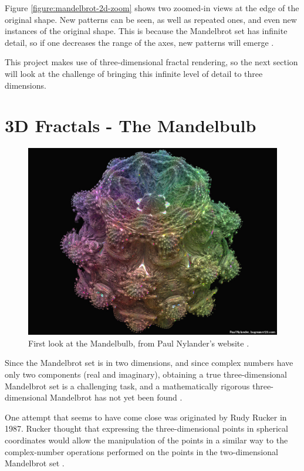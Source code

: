 Figure \ref{figure:mandelbrot-2d-zoom} shows two zoomed-in views at the edge of the original shape. New patterns can be seen, as well as repeated ones, and even new instances of the original shape. This is because the Mandelbrot set has infinite detail, so if one decreases the range of the axes, new patterns will emerge \cite{ashlock2006evolutionary}.\newline

This project makes use of three-dimensional fractal rendering, so the next section will look at the challenge of bringing this infinite level of detail to three dimensions.

\newpage

\section{3D Fractals - The Mandelbulb}

\begin{figure} [ht]
	\centering
	\includegraphics[width=0.5\linewidth, frame]{Images/Mandelbulb-First-Look.jpg}
	\caption{First look at the Mandelbulb, from Paul Nylander's website \cite{nylander-mandelbulb-image}.}
	\label{figure:mandelbulb-first-look}
\end{figure}

Since the Mandelbrot set is in two dimensions, and since complex numbers have only two components (real and imaginary), obtaining a true three-dimensional Mandelbrot set is a challenging task, and a mathematically rigorous three-dimensional Mandelbrot has not yet been found \cite{aron2009mandelbulb}.\newline

One attempt that seems to have come close was originated by Rudy Rucker in 1987. Rucker thought that expressing the three-dimensional points in spherical coordinates would allow the manipulation of the points in a similar way to the complex-number operations performed on the points in the two-dimensional Mandelbrot set \cite{rucker2009search}.\newline

